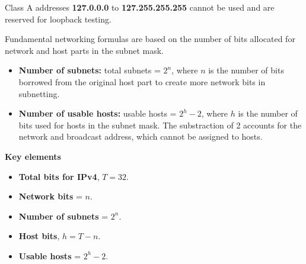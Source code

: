 Class A addresses \textbf{127.0.0.0} to \textbf{127.255.255.255} cannot be used and are reserved for loopback testing.

Fundamental networking formulas are based on the number of bits allocated for network and host parts in the subnet mask.

\begin{itemize}
  \item \textbf{Number of subnets:} total subnets = $2^n$, where $n$ is the number of bits borrowed from the original host part to create more network bits in subnetting.
  \item \textbf{Number of usable hosts:} usable hosts = $2^h - 2$, where $h$ is the number of bits used for hosts in the subnet mask. The substraction of 2 accounts for the network and broadcast address, which cannot be assigned to hosts.
\end{itemize}

\textbf{Key elements}

\begin{itemize}
  \item \textbf{Total bits for IPv4}, $T = 32$.
  \item \textbf{Network bits} = $n$.
  \item \textbf{Number of subnets} = $2^n$.
  \item \textbf{Host bits}, $h = T - n$.
  \item \textbf{Usable hosts} = $2^h - 2$.
\end{itemize}
